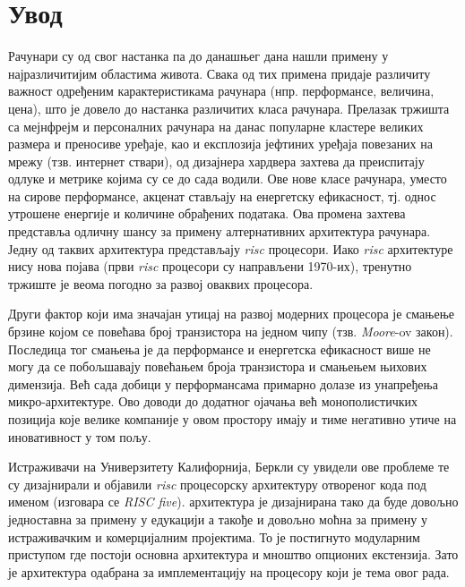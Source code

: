 \chapter{Увод}

Рачунари су од свог настанка па до данашњег дана нашли примену у најразличитијим областима живота.
Свака од тих примена придаје различиту важност одређеним карактеристикама рачунара (нпр. перформансе, величина, цена),
што је довело до настанка различитих класа рачунара. Прелазак тржишта са мејнфрејм и персоналних рачунара на данас популарне кластере великих размера и преносиве уређаје, као и експлозија јефтиних уређаја повезаних на мрежу (тзв. интернет ствари), од дизајнера хардвера захтева да преиспитају одлуке и метрике којима су се до сада водили.
Ове нове класе рачунара, уместо на сирове перформансе, акценат стављају на енергетску ефикасност, тј. однос утрошене енергије и количине обрађених података.
Ова промена захтева представља одличну шансу за примену алтернативних архитектура рачунара. Једну од таквих архитектура представљају \textit{\acrfull{risc}} процесори. Иако \textit{\acrshort{risc}} архитектуре нису нова појава (први \textit{\acrshort{risc}} процесори су направљени 1970-их), тренутно тржиште је веома погодно за развој оваквих процесора.

Други фактор који има значајан утицај на развој модерних процесора је смањење брзине којом се повећава број транзистора на једном чипу (тзв. \textit{Moore}-ov закон).
Последица тог смањења је да перформансе и енергетска ефикасност више не могу да се побољшавају повећањем броја транзистора и смањењем њихових димензија. Већ сада добици у перформансама примарно долазе из унапређења микро-архитектуре. Ово доводи до додатног ојачања већ монополистичких позиција које велике компаније у овом простору имају и тиме негативно утиче на иновативност у том пољу.

Истраживачи на Универзитету Калифорнија, Беркли су увидели ове проблеме те су дизајнирали и објавили \textit{\acrshort{risc}} процесорску архитектуру отвореног кода под именом \cite{riscv} (изговара се \textit{RISC five}).  архитектура је дизајнирана тако да буде довољно једноставна за примену у едукацији а такође и довољно моћна за примену у истраживачким\cite{rocket} и комерцијалним\cite{sifive}\cite{tenstorrent} пројектима. То је постигнуто модуларним приступом где постоји основна архитектура и мноштво опционих екстензија. Зато је  архитектура одабрана за имплементацију на процесору који је тема овог рада.

